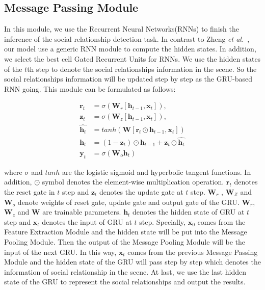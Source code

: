 \documentclass{article}
\newcommand{\etal}{{\it et al.}}
\begin{document}
\subsection{Message Passing Module} \label{section:RRNN}
In this module, we use the Recurrent Neural Networks(RNNs) to finish the inference of the social relationship detection task. In contrast to Zheng \etal \ \cite{DBLP:conf/iccv/0001JRVSDHT15}, our model use a generic RNN module to compute the hidden states. In addition, we select the best cell Gated Recurrent Units \cite{DBLP:conf/ssst/2014} for RNNs. We use the hidden states of the $t$th step to denote the social relationships information in the scene. So the social relationships information will be updated step by step as the GRU-based RNN going. This module can be formulated as follows:

\begin{equation}
\begin{split}
\bm{r}_t &=  \sigma(\bm{W}_{r}[\bm{h}_{t-1}, \bm{x}_t]), \\
\bm{z}_t &=  \sigma(\bm{W}_{z}[\bm{h}_{t-1}, \bm{x}_t]), \\
\hat{\bm{h}_t} &= tanh(\bm{W}[\bm{r}_t \odot \bm{h}_{t-1}, \bm{x}_{t}])\\
\bm{h}_t &= (1 - \bm{z}_t) \odot \bm{h}_{t - 1} + \bm{z}_t \odot \hat{\bm{h}_t} \\
\bm{y}_t &= \sigma (\bm{W}_o\bm{h}_t)
\end{split}
\end{equation}

where $\sigma$ and $tanh$ are the logistic sigmoid and hyperbolic tangent functions. In addition, $\odot$ symbol denotes the element-wise multiplication operation. $\bm{r}_t$ denotes the reset gate in $t$ step and $\bm{z}_t$ denotes the update gate at $t$ step. $\bm{W}_r$ , $\bm{W}_Z$ and $\bm{W}_o$ denote weights of reset gate, update gate and output gate of the GRU. $\bm{W}_r$, $\bm{W}_z$ and $\bm{W}$ are trainable parameters. $\bm{h}_t$ denotes the hidden state of GRU at $t$ step and $\bm{x}_t$ denotes the input of GRU at $t$ step. Specially, $\bm{x}_0$ comes from the Feature Extraction Module and the hidden state will be put into the Message Pooling Module. Then the output of the Message Pooling Module will be the input of the next GRU. In this way, $\bm{x}_t$ comes from the previous Message Passing Module and the hidden state of the GRU will pass step by step which denotes the information of social relationship in the scene. At last, we use the last hidden state of the GRU to represent the social relationships and output the results.
\end{document}
